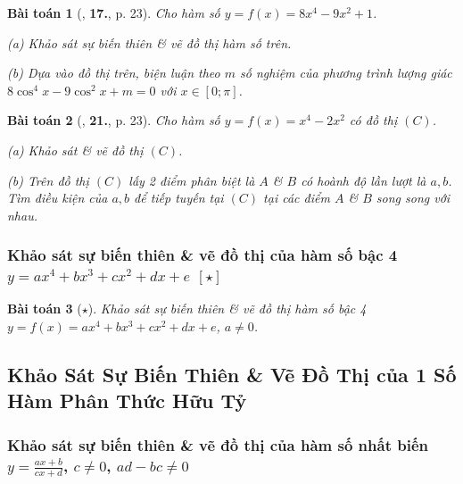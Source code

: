 \documentclass[12pt]{article}
\numberwithin{equation}{section}
\newtheorem{baitoan}{Bài toán}[section]
\begin{document}
\begin{baitoan}[\cite{TL_chuyen_Toan_Giai_Tich_12}, \textbf{17.}, p. 23]
	Cho hàm số $y = f(x) = 8x^4 - 9x^2 + 1$.
	\begin{enumerate*}
		\item[(a)] Khảo sát sự biến thiên \& vẽ đồ thị hàm số trên.
		\item[(b)] Dựa vào đồ thị trên, biện luận theo $m$ số nghiệm của phương trình lượng giác $8\cos^4x - 9\cos^2x + m = 0$ với $x\in[0;\pi]$.
	\end{enumerate*}
\end{baitoan}

\begin{baitoan}[\cite{TL_chuyen_Toan_Giai_Tich_12}, \textbf{21.}, p. 23]
	Cho hàm số $y = f(x) = x^4 - 2x^2$ có đồ thị $(C)$.
	\begin{enumerate*}
		\item[(a)] Khảo sát \& vẽ đồ thị $(C)$.
		\item[(b)] Trên đồ thị $(C)$ lấy 2 điểm phân biệt là $A$ \& $B$ có hoành độ lần lượt là $a,b$. Tìm điều kiện của $a,b$ để tiếp tuyến tại $(C)$ tại các điểm $A$ \& $B$ song song với nhau.
	\end{enumerate*}
\end{baitoan}

\subsubsection{Khảo sát sự biến thiên \& vẽ đồ thị của hàm số bậc 4 $y = ax^4 + bx^3 + cx^2 + dx + e$ $[\star]$}

\begin{baitoan}[$\star$]
	Khảo sát sự biến thiên \& vẽ đồ thị hàm số bậc 4 $y = f(x) = ax^4 + bx^3 + cx^2 + dx + e$, $a\ne 0$.
\end{baitoan}

\subsection{Khảo Sát Sự Biến Thiên \& Vẽ Đồ Thị của 1 Số Hàm Phân Thức Hữu Tỷ}

\subsubsection{Khảo sát sự biến thiên \& vẽ đồ thị của hàm số nhất biến $y = \frac{ax + b}{cx + d}$, $c\ne 0$, $ad - bc\ne 0$}
\end{document}
